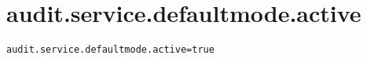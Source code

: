 \section{audit.service.defaultmode.active}
\label{configuration:AuditServiceDefaultmodeActive}
\AvailableInJavaOnly{\TODO}
\begin{lstlisting}[style=Props,caption={Usage example for \textit{audit.service.defaultmode.active}}]
audit.service.defaultmode.active=true
\end{lstlisting}